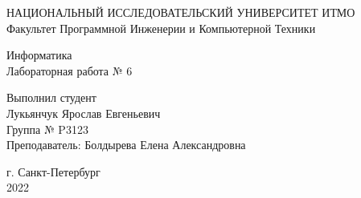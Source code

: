 
    \pagestyle{main_titul}  
    \begin{center}
        НАЦИОНАЛЬНЫЙ ИССЛЕДОВАТЕЛЬСКИЙ УНИВЕРСИТЕТ ИТМО \\
        Факультет Программной Инженерии и Компьютерной Техники
    \end{center}
    \vspace{250pt}
    \begin{center}
    Информатика \\
    Лабораторная работа № 6 \\ 
    \end{center}
    \vspace{70pt}
    \hspace*{0pt}\hfill Выполнил студент \\
    \hspace*{0pt}\hfill Лукьянчук Ярослав Евгеньевич \\
    \hspace*{0pt}\hfill Группа № P3123 \\
    \hspace*{0pt}\hfill Преподаватель: Болдырева Елена Александровна \\ 
    \vspace{180pt}
    \begin{center}
    г. Санкт-Петербург \\
    2022
    \end{center}
    \newpage